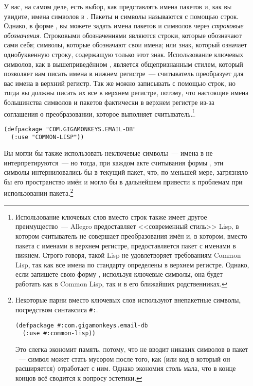 У вас, на самом деле, есть выбор, как представлять имена пакетов и, как вы увидите, имена
символов в . Пакеты и символы называются с помощью строк. Однако, в форме
, вы можете задать имена пакетов и символов через \textit{строковые
  обозначения}. Строковыми обозначениями являются строки, которые обозначают сами себя;
символы, которые обозначают свои имена; или знак, который означает однобуквенную строку,
содержащую только этот знак. Использование ключевых символов, как в вышеприведённом
, является общепризнанным стилем, который позволяет вам писать имена в
нижнем регистре~--- считыватель преобразует для вас имена в верхний регистр.  Так же можно
записывать  с помощью строк, но тогда вы должны писать их все в верхнем
регистре, потому, что настоящие имена большинства символов и пакетов фактически в верхнем
регистре из-за соглашения о преобразовании, которое выполняет
считыватель.\footnote{Использование ключевых слов вместо строк также имеет другое
  преимущество~--- Allegro предоставляет <<современный стиль>> Lisp, в котором считыватель
  не совершает преобразования имён и, в котором, вместо пакета  с
  именами в верхнем регистре, предоставляется пакет  с именами в нижнем.
  Строго говоря, такой Lisp не удовлетворяет требованиям Common Lisp, так как все имена по
  стандарту определены в верхнем регистре. Однако, если запишете свою форму
  , используя ключевые символы, она будет работать как в Common Lisp, так
  и в его ближайших родственниках.}

\begin{lstlisting}
(defpackage "COM.GIGAMONKEYS.EMAIL-DB"
  (:use "COMMON-LISP"))
\end{lstlisting}

Вы могли бы также использовать неключевые символы~--- имена в  не
интерпретируются~--- но тогда, при каждом акте считывания формы , эти
символы интерниловались бы в текущий пакет, что, по меньшей мере, загрязняло бы его
пространство имён и могло бы в дальнейшем привести к проблемам при использовании
пакета.\footnote{Некоторые парни вместо ключевых слов используют внепакетные символы,
  посредством синтаксиса \lstinline!#:!.

\begin{lstlisting}
(defpackage #:com.gigamonkeys.email-db
  (:use #:common-lisp))
\end{lstlisting}

Это слегка экономит память, потому, что не вводит никаких символов в пакет 
~--- символ может стать мусором после того, как  (или код в который он
расширяется) отработает с ним. Однако экономия столь мала, что в конце концов всё сводится
к вопросу эстетики.}

